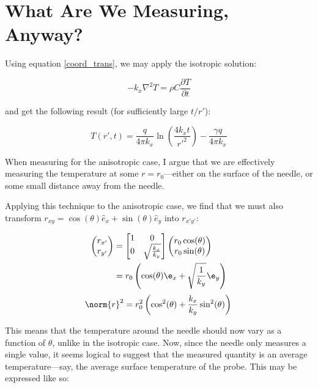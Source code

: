 \section{What Are We Measuring, Anyway?}

Using equation \ref{coord_trans}, we may apply the isotropic solution:

\begin{equation}
    -k_x \nabla^2 T = \rho C\frac{\partial T}{\partial t}
\end{equation}

and get the following result (for sufficiently large \(t/r'\)):

\begin{equation}
T(r',t) = \frac{q}{4\pi k_x}\ln\left(\frac{4k_xt}{r'^2}\right) - \frac{\gamma q}{4\pi k_x}
\end{equation}

When measuring for the anisotropic case, I argue that we are effectively measuring the temperature at some \(r = r_{\textrm{0}}\)---either on the surface of the needle, or some small distance away from the needle.

Applying this technique to the anisotropic case, we find that we must also transform \(r_{xy} = \cos(\theta) \hat{e}_x + \sin(\theta) \hat{e}_y \) into \(r_{x'y'}\):

\begin{align*}
    \begin{pmatrix}r_{x'} \\ r_{y'}\end{pmatrix} &=
    \begin{bmatrix}1 & 0\\ 0 & \sqrt{\frac{k_x}{k_y}} \end{bmatrix}\begin{pmatrix}r_0\cos(\theta) \\ r_0\sin(\theta)\end{pmatrix}\\
    &= r_0\left(\cos(\theta) \e_x + \sqrt{\frac1{k_y}} \e_y \right)\\
\end{align*}
\begin{equation}
    \norm{r}^2 = r_0^2 \left(\cos^2(\theta) + \frac{k_x}{k_y}\sin^2(\theta) \right)\\
\end{equation}

This means that the temperature around the needle should now vary as a function of \(\theta\), unlike in the isotropic case. Now, since the needle only measures a single value, it seems logical to suggest that the measured quantity is an average temperature---say, the average surface temperature of the probe.  This may be expressed like so:

